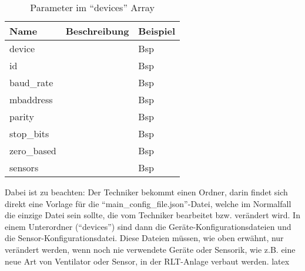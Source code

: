 \begin{enumerate}
	\begin{table}[H]
		\caption{Parameter im \enquote{devices} Array}
		\label{tab:devices_array_parameter}
		\begin{tabularx}{\textwidth}{@{}lX|X@{}}
			\toprule
			\textbf{Name} & \textbf{Beschreibung} & \textbf{Beispiel} \\
			\midrule
			device     	&  & Bsp \\
			id         	&  & Bsp \\
			baud\_rate	&  & Bsp \\
			mbaddress	&  & Bsp \\
			parity	&  & Bsp \\
			stop\_bits	&  & Bsp \\
			zero\_based	&  & Bsp \\
			sensors	&  & Bsp \\
			\bottomrule
		\end{tabularx}
	\end{table} 
	
\end{enumerate}

Dabei ist zu beachten:
Der Techniker bekommt einen Ordner, darin findet sich direkt eine Vorlage für die \enquote{main\_config\_file.json}-Datei, welche im Normalfall die einzige Datei sein sollte, die vom Techniker bearbeitet bzw. verändert wird.
In einem Unterordner (\enquote{devices}) sind dann die Geräte-Konfigurationsdateien und die Sensor-Konfigurationsdatei. Diese Dateien müssen, wie oben erwähnt, nur verändert werden, wenn noch nie verwendete Geräte oder Sensorik, wie z.B. eine neue Art von Ventilator oder Sensor, in der RLT-Anlage verbaut werden.
\gls{latex}




